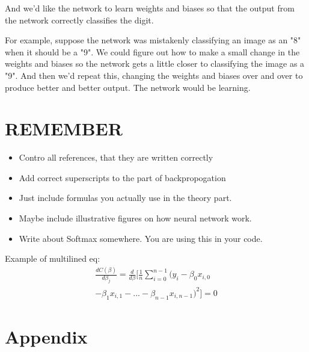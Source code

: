 \documentclass[a4paper,11pt,twocolumn]{article}
\begin{document}
And we'd like the network to learn weights and biases so that the output from the network correctly classifies the digit.

For example, suppose the network was mistakenly classifying an image as an "8" when it should be a "9". We could figure out how to make a small change in the weights and biases so the network gets a little closer to classifying the image as a "9". And then we'd repeat this, changing the weights and biases over and over to produce better and better output. The network would be learning.

\section{REMEMBER}
\begin{itemize}
\item Contro all references, that they are written correctly 
\item Add correct superscripts to the part of backpropogation
\item Just include formulas you actually use in the theory part.
\item Maybe include illustrative figures on how neural network work.
\item Write about Softmax somewhere. You are using this in your code. 
\end{itemize}

Example of multilined eq:
\begin{equation}
\begin{multlined}
\frac{dC(\beta)}{d\beta_j}= \frac{d}{d\beta}[\frac{1}{n}\sum\limits_{i=0}^{n-1}(y_i-\beta_0x_{i,0}\\-\beta_1x_{i,1}-...-\beta_{n-1}x_{i,n-1})^2] = 0
\end{multlined}
\end{equation}
 
\section{Appendix}
\end{document}
